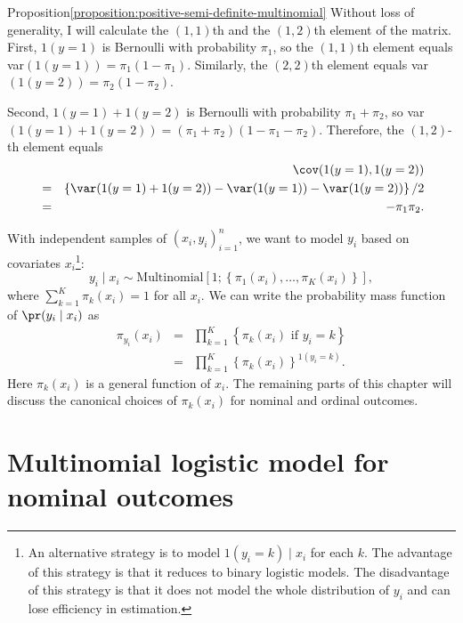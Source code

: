 \begin{myproof}{Proposition}{\ref{proposition:positive-semi-definite-multinomial}}
Without loss of generality, I will calculate the $(1,1)$th and the $(1,2)$th element of the matrix. First, $1(y=1)$ is Bernoulli with probability $\pi_1$, so the $(1,1)$th element equals var$( 1(y=1) ) = \pi_1 (1 - \pi_1)$. Similarly, the $(2,2)$th element equals var$( 1(y=2) ) = \pi_2 (1 - \pi_2)$.

Second, $1(y=1) +1(y=2)$ is Bernoulli with probability $\pi_1 + \pi_2$, so var$(1(y=1) +1(y=2)) = (\pi_1 + \pi_2)(1-\pi_1 -\pi_2)$. Therefore, the $(1,2)$-th element equals
\begin{eqnarray*}
&&\cov(1(y=1), 1(y=2) ) \\
&=& \left\{ \var( 1(y=1) +1(y=2) ) - \var( 1(y=1)) - \var(1(y=2)) \right\} / 2 \\
&=& -\pi_1 \pi_2.
\end{eqnarray*}  
\end{myproof}



With independent samples of $(x_{i},y_{i})_{i=1}^{n}$, we want to
model $y_{i}$ based on covariates $x_{i}$\footnote{An alternative  strategy is to model $1(y_i=k)\mid x_i$ for each $k$. The advantage of this strategy is that it reduces to binary logistic models. The disadvantage of this strategy is that it does not model the whole distribution of $y_i$ and can lose efficiency in estimation.}:
\[
y_{i}\mid x_{i}\sim\text{Multinomial}\left[1;\left\{ \pi_{1}(x_{i}),\ldots,\pi_{K}(x_{i})\right\} \right],
\]
where $\sum_{k=1}^{K}\pi_{k}(x_{i})=1$  for all $x_{i}.$
We can write the probability mass function of $\pr( y_{i}\mid x_{i} ) $ as
\begin{eqnarray*}
\pi_{y_i}(x_i) 
&=& 
  \prod_{k=1}^{K}  \left\{   \pi_{k}(x_{i}) \text{ if } y_{i}=k\right\}  \\
&=&  \prod_{k=1}^{K}\left\{ \pi_{k}(x_{i})\right\} ^{1(y_{i}=k) }.
\end{eqnarray*}
Here $\pi_{k}(x_{i} ) $ is a general function of $x_i$. The remaining parts of this chapter will discuss the canonical choices of $\pi_{k}(x_{i} ) $ for nominal and ordinal outcomes. 




\section{Multinomial logistic model for nominal outcomes}

